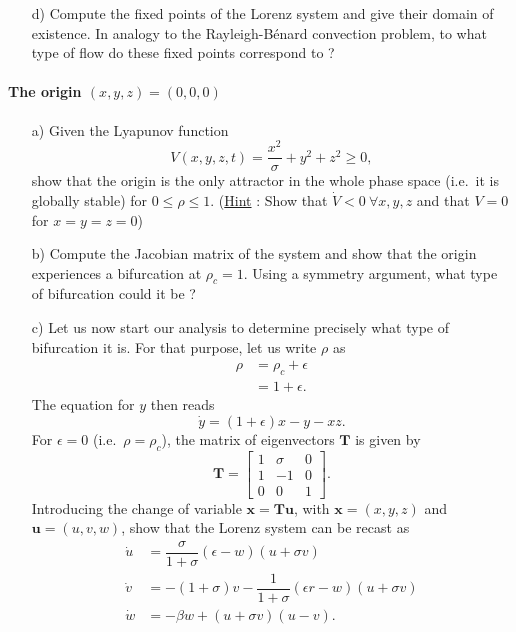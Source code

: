 \begin{problem}
\begin{enumerate}
  \item[d)] Compute the fixed points of the Lorenz system and give their domain of existence.
    In analogy to the Rayleigh-Bénard convection problem, to what type of flow do these fixed points correspond to ?
  \end{enumerate}

  \paragraph{The origin $(x, y, z) = (0, 0, 0)$}
  \begin{enumerate}
    \item[a)] Given the Lyapunov function
    \[
    V(x, y, z, t) = \dfrac{x^2}{\sigma} + y^2 + z^2 \geq 0,
    \]
    show that the origin is the only attractor in the whole phase space (i.e.\ it is globally stable) for $0 \leq \rho \leq 1$.
    (\underline{Hint} : Show that $\dot{V} < 0 \ \forall x, y, z$ and that $V = 0$ for $x = y = z = 0$)

  \item[b)] Compute the Jacobian matrix of the system and show that the origin experiences a bifurcation at $\rho_c = 1$.
    Using a symmetry argument, what type of bifurcation could it be ?

  \item[c)] Let us now start our analysis to determine precisely what type of bifurcation it is.
    For that purpose, let us write $\rho$ as
    \[
    \begin{aligned}
      \rho & = \rho_c + \epsilon \\
      & = 1 + \epsilon.
    \end{aligned}
    \]
    The equation for $y$ then reads
    \[
    \dot{y} = \left( 1 + \epsilon \right) x - y - xz.
    \]
    For $\epsilon = 0$ (i.e.\ $\rho = \rho_c$), the matrix of eigenvectors $\bm{T}$ is given by
    \[
    \bm{T}
    =
    \begin{bmatrix}
      1 & \sigma & 0 \\
      1 & -1 & 0 \\
      0 & 0 & 1
    \end{bmatrix}.
    \]
    Introducing the change of variable $\bm{x} = \bm{T} \bm{u}$, with $\bm{x} = (x, y, z)$ and $\bm{u} = (u, v, w)$, show that the Lorenz system can be recast as
    \[
    \begin{aligned}
      \dot{u} & = \dfrac{\sigma}{1+\sigma} \left( \epsilon - w \right) \left( u + \sigma v \right) \\
      \dot{v} & = -\left( 1 + \sigma \right) v - \dfrac{1}{1 + \sigma} \left( \epsilon r - w \right) \left( u + \sigma v \right) \\
      \dot{w} & = -\beta w + \left( u + \sigma v \right) \left( u - v \right).
    \end{aligned}
    \]


\end{enumerate}
\end{problem}
